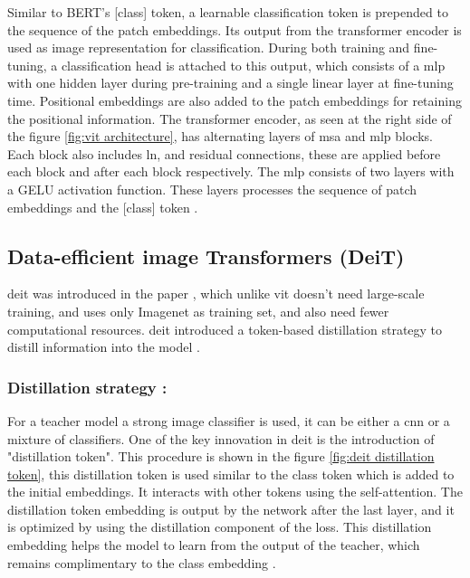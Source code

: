 Similar to BERT's [class] token, a learnable classification token is prepended to the sequence of the patch embeddings. Its output from the transformer encoder is used as image representation for classification. During both training and fine-tuning, a classification head is attached to this output, which consists of a \gls{mlp} with one hidden layer during pre-training and a single linear layer at fine-tuning time. Positional embeddings are also added to the patch embeddings for retaining the positional information. The transformer encoder, as seen at the right side of the figure \ref{fig:vit architecture}, has alternating layers of \gls{msa} and \gls{mlp} blocks. Each block also includes \gls{ln}, and residual connections, these are applied before each block and after each block respectively. The \gls{mlp} consists of two layers with a GELU activation function. These layers processes the sequence of patch embeddings and the [class] token \cite{dosovitskiy2020image}.

\subsection{Data-efficient image Transformers (DeiT)}

\gls{deit} was introduced in the paper \cite{pmlr-v139-touvron21a}, which unlike \gls{vit}\cite{dosovitskiy2020image} doesn't need large-scale training, and uses only Imagenet as training set, and also need fewer computational resources. \gls{deit} introduced a token-based distillation strategy to distill information into the model \cite{pmlr-v139-touvron21a}.

\subsubsection*{Distillation strategy :}

For a teacher model a strong image classifier is used, it can be either a \gls{cnn} or a mixture of classifiers. One of the key innovation in \gls{deit} is the introduction of "distillation token". This procedure is shown in the figure \ref{fig:deit distillation token}, this distillation token is used similar to the class token which is added to the initial embeddings. It interacts with other tokens using the self-attention. The distillation token embedding is output by the network after the last layer, and it is optimized by using the distillation component of the loss. This distillation embedding helps the model to learn from the output of the teacher, which remains complimentary to the class embedding \cite{pmlr-v139-touvron21a}.

